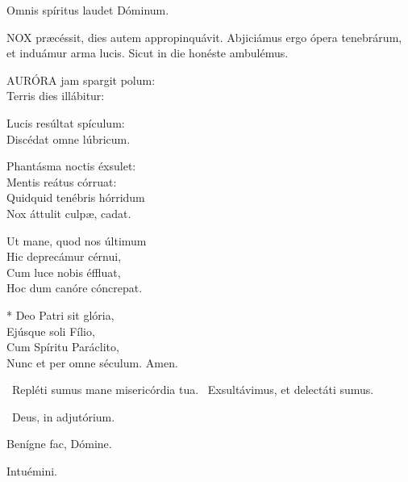  Omnis spíritus laudet Dóminum.




\lettrine[lines=2]{N}{OX} præcéssit, dies autem appropinquávit. Abjiciámus ergo ópera tenebrárum, et induámur arma lucis. Sicut in die honéste ambulémus.


\lettrine[lines=2]{A}{URÓRA} jam spargit polum:\\
Terris dies illábitur:

Lucis resúltat spículum:\\
Discédat omne lúbricum.

Phantásma noctis éxsulet:\\
Mentis reátus córruat:\\
Quidquid tenébris hórridum\\
Nox áttulit culpæ, cadat.

Ut mane, quod nos últimum\\
Hic deprecámur cérnui,\\
Cum luce nobis éffluat,\\
Hoc dum canóre cóncrepat.

* Deo Patri sit glória,\\
Ejúsque soli Fílio,\\
Cum Spíritu Paráclito,\\
Nunc et per omne séculum. Amen.

\V\ Repléti sumus mane misericórdia tua. \R\ Exsultávimus, et delectáti sumus.



\sectionornament


\textit{}


\V\ Deus, in adjutórium.

 Benígne fac, Dómine.

  Intuémini.

